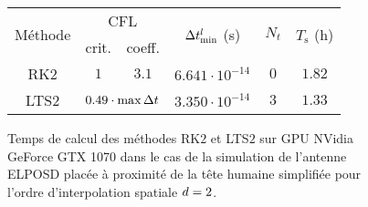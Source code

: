 \begin{figure}[!h]
	\centering
	\caption{
		\label{tab:lts2_perfs_o2}
		Temps de calcul des méthodes RK$2$ et LTS$2$
		sur GPU NVidia GeForce GTX 1070
		dans le cas de la simulation de l'antenne ELPOSD
		placée à proximité de la tête humaine simplifiée
		pour l'ordre d'interpolation spatiale $d = 2$.
	}
	
	\begin{tabular}{|c|c|c|c|c|c|}
		\hline
		\multirow{2}{*}{Méthode} & \multicolumn{2}{c|}{CFL} & \multirow{2}{*}{$\Delta t_{\min}^l$ (s)} & \multirow{2}{*}{$N_t$} & \multirow{2}{*}{$T_\mathrm{s}$ (h)} \\	\cline{2-3}
		& crit. & coeff. & & & \\	\hline\hline
		RK$2$ & $1$ & $3.1$ & $6.641 \cdot 10^{-14}$ & $0$ & $1.82$ \\ \hline
		LTS$2$ & \multicolumn{2}{c|}{$0.49 \cdot \max \Delta t$} & $3.350 \cdot 10^{-14}$ & $3$ & $1.33$ \\ \hline
	\end{tabular}
\end{figure}


